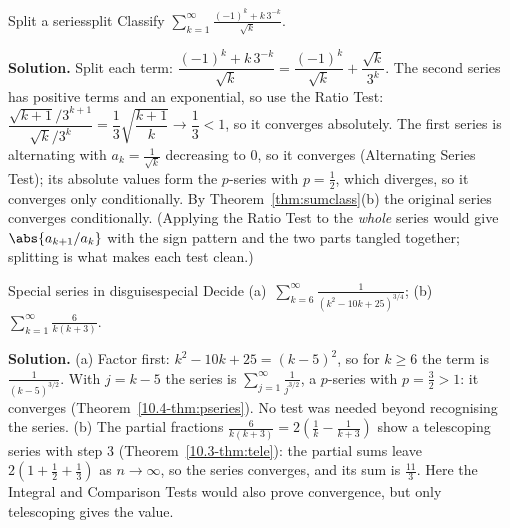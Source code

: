 \documentclass[11pt]{article}
\begin{document}
\begin{exmp}{Split a series}{split}
Classify $\displaystyle\sum_{k=1}^\infty\frac{(-1)^k+k\,3^{-k}}{\sqrt k}$.

\textbf{Solution.} Split each term: $\dfrac{(-1)^k+k\,3^{-k}}{\sqrt k}=\dfrac{(-1)^k}{\sqrt k}+\dfrac{\sqrt k}{3^k}$.
The second series has positive terms and an exponential, so use the Ratio Test: $\dfrac{\sqrt{k+1}/3^{k+1}}{\sqrt k/3^k}=\dfrac13\sqrt{\dfrac{k+1}k}\to\dfrac13<1$, so it converges absolutely. The first series is alternating with $a_k=\frac1{\sqrt k}$ decreasing to $0$, so it converges (Alternating Series Test); its absolute values form the $p$-series with $p=\frac12$, which diverges, so it converges only conditionally. By Theorem~\ref{thm:sumclass}(b) the original series converges conditionally.
(Applying the Ratio Test to the \emph{whole} series would give $\abs{a_{k+1}/a_k}$ with the sign pattern and the two parts tangled together; splitting is what makes each test clean.)
\end{exmp}

\begin{exmp}{Special series in disguise}{special}
Decide (a)~$\displaystyle\sum_{k=6}^\infty\frac1{\left(k^2-10k+25\right)^{3/4}}$; \quad (b)~$\displaystyle\sum_{k=1}^\infty\frac6{k(k+3)}$.

\textbf{Solution.} (a) Factor first: $k^2-10k+25=(k-5)^2$, so for $k\ge6$ the term is $\frac1{(k-5)^{3/2}}$. With $j=k-5$ the series is $\sum_{j=1}^\infty\frac1{j^{3/2}}$, a $p$-series with $p=\frac32>1$: it converges (Theorem~\ref{10.4-thm:pseries}). No test was needed beyond recognising the series.
(b) The partial fractions $\frac6{k(k+3)}=2\left(\frac1k-\frac1{k+3}\right)$ show a telescoping series with step $3$ (Theorem~\ref{10.3-thm:tele}): the partial sums leave $2\left(1+\frac12+\frac13\right)$ as $n\to\infty$, so the series converges, and its sum is $\frac{11}3$. Here the Integral and Comparison Tests would also prove convergence, but only telescoping gives the value.
\end{exmp}
\end{document}
